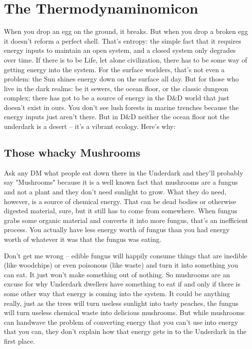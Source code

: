 \section{The Thermodynaminomicon} %
\vspace*{-10pt}

When you drop an egg on the ground, it breaks. But when you drop a broken egg it doesn't reform a perfect shell. That's entropy: the simple fact that it requires energy inputs to maintain an open system, and a closed system only degrades over time. If there is to be Life, let alone civilization, there has to be some way of getting energy into the system. For the surface worlders, that's not even a problem: the Sun shines energy down on the surface all day. But for those who live in the dark realms: be it sewers, the ocean floor, or the classic dungeon complex; there has got to be a source of energy in the D\&D world that just doesn't exist in ours. You don't see lush forests in marine trenches because the energy inputs just aren't there. But in D\&D neither the ocean floor not the underdark is a desert -- it's a vibrant ecology. Here's why:

\subsection{Those whacky Mushrooms}

Ask any DM what people eat down there in the Underdark and they'll probably say "Mushrooms" because it is a well known fact that mushrooms are a fungus and not a plant and they don't need sunlight to grow. What they do need, however, is a source of chemical energy. That can be dead bodies or otherwise digested material, sure, but it still has to come from somewhere. When fungus grabs some organic material and converts it into more fungus, that's an inefficient process. You actually have less energy worth of fungus than you had energy worth of whatever it was that the fungus was eating.

Don't get me wrong -- edible fungus will happily consume things that are inedible (like woodchips) or even poisonous (like waste) and turn it into something you can eat. It just won't make something out of nothing. So mushrooms are an excuse for why Underdark dwellers have something to eat if and only if there is some other way that energy is coming into the system. It could be anything really, just as the trees will turn useless sunlight into tasty peaches, the fungus will turn useless chemical waste into delicious mushrooms. But while mushrooms can handwave the problem of converting energy that you can't use into energy that you can, they don't explain how that energy gets in to the Underdark in the first place.

